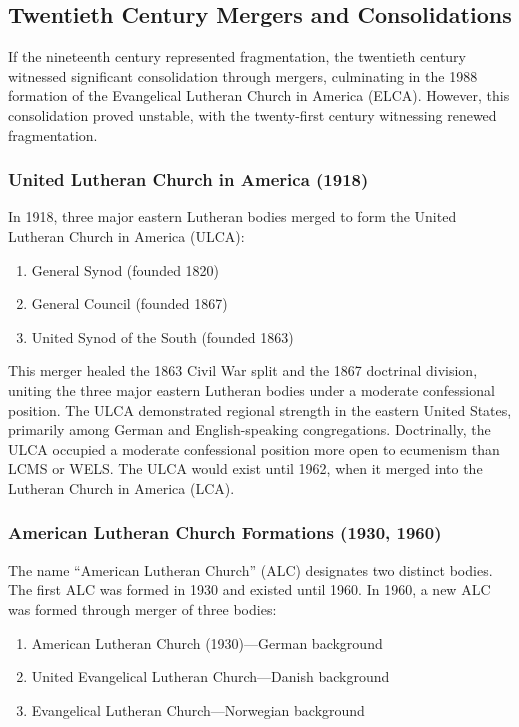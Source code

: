 \subsection{Twentieth Century Mergers and Consolidations}

If the nineteenth century represented fragmentation, the twentieth century witnessed significant consolidation through mergers, culminating in the 1988 formation of the Evangelical Lutheran Church in America (ELCA). However, this consolidation proved unstable, with the twenty-first century witnessing renewed fragmentation.

\subsubsection{United Lutheran Church in America (1918)}

In 1918, three major eastern Lutheran bodies merged to form the United Lutheran Church in America (ULCA):

\begin{enumerate}
\item General Synod (founded 1820)
\item General Council (founded 1867)
\item United Synod of the South (founded 1863)
\end{enumerate}

This merger healed the 1863 Civil War split and the 1867 doctrinal division, uniting the three major eastern Lutheran bodies under a moderate confessional position. The ULCA demonstrated regional strength in the eastern United States, primarily among German and English-speaking congregations. Doctrinally, the ULCA occupied a moderate confessional position more open to ecumenism than LCMS or WELS. The ULCA would exist until 1962, when it merged into the Lutheran Church in America (LCA).

\subsubsection{American Lutheran Church Formations (1930, 1960)}

The name ``American Lutheran Church'' (ALC) designates two distinct bodies. The first ALC was formed in 1930 and existed until 1960. In 1960, a new ALC was formed through merger of three bodies:

\begin{enumerate}
\item American Lutheran Church (1930)---German background
\item United Evangelical Lutheran Church---Danish background
\item Evangelical Lutheran Church---Norwegian background
\end{enumerate}

